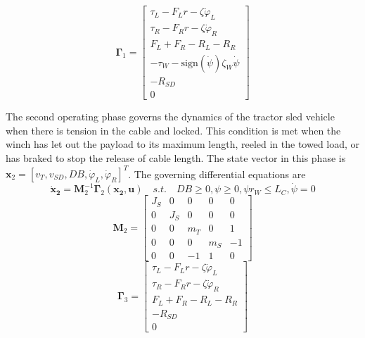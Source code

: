\begin{equation}
     \mathbf{\Gamma}_1 = \begin{bmatrix} \tau_L - F_Lr - \zeta\dot\varphi_L \\ \tau_R - F_Rr - \zeta\dot\varphi_R \\ F_L + F_R - R_L - R_R \\ -\tau_W - \text{sign}(\dot\psi)\zeta_W\dot\psi \\ -R_{SD} \\ 0 \end{bmatrix}
\end{equation}

The second operating phase governs the dynamics of the tractor sled vehicle when there is tension in the cable and locked. This condition is met when the winch has let out the payload to its maximum length, reeled in the towed load, or has braked to stop the release of cable length. The state vector in this phase is $\mathbf{x}_2 = [v_T, v_{SD}, DB, \dot\varphi_L, \dot\varphi_R]^T$. The governing differential equations are 
\begin{equation}
    \mathbf{\dot x_2} = \mathbf{M}_2^{-1}\mathbf{\Gamma}_2(\mathbf{x_2},\mathbf{u}) \quad s.t. \quad DB\geq0, \psi\geq0, \psi r_W \leq L_C, \dot\psi = 0
\end{equation}
\begin{equation}
     \mathbf{M}_2 = \begin{bmatrix} J_S & 0 & 0 & 0 & 0 \\ 0 & J_S & 0 & 0 & 0 \\ 0 & 0 & m_T & 0 & 1 \\ 0 & 0 & 0 & m_S & -1 \\ 0 & 0 & -1 & 1 & 0 \end{bmatrix}
\end{equation}
\begin{equation}
     \mathbf{\Gamma}_3 = \begin{bmatrix} \tau_L - F_Lr - \zeta\dot\varphi_L \\ \tau_R - F_Rr - \zeta\dot\varphi_R \\ F_L + F_R - R_L - R_R \\ -R_{SD} \\ 0 \end{bmatrix}
\end{equation}

